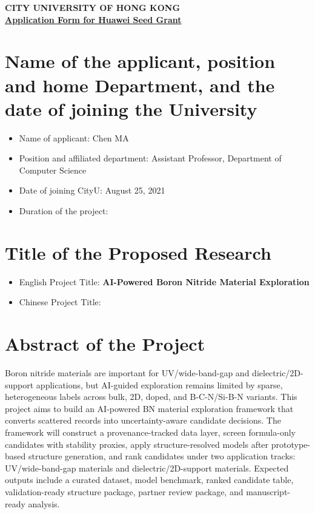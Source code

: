 \documentclass[10pt,a4paper]{article}
\newcommand{\blank}[1][7em]{\colorbox{yellow!35}{\rule{0pt}{1.05em}\hspace{#1}}}
\begin{document}
\vspace*{-34pt}
\begin{center}
    \textbf{CITY UNIVERSITY OF HONG KONG}\\
    \vspace{6pt}
    \underline{\textbf{Application Form for Huawei Seed Grant}}
\end{center}

\section{Name of the applicant, position and home Department, and the date of joining the University}
\begin{itemize}[leftmargin=15pt]
    \item Name of applicant: Chen MA
    \item Position and affiliated department: Assistant Professor, Department of Computer Science
    \item Date of joining CityU: August 25, 2021
    \item Duration of the project: \blank[18em]
\end{itemize}

\section{Title of the Proposed Research}
\begin{itemize}[leftmargin=15pt]
    \item English Project Title: \textbf{AI-Powered Boron Nitride Material Exploration}
    \item Chinese Project Title: \blank[18em]
\end{itemize}

\section{Abstract of the Project}
Boron nitride materials are important for UV/wide-band-gap and dielectric/2D-support applications, but AI-guided exploration remains limited by sparse, heterogeneous labels across bulk, 2D, doped, and B-C-N/Si-B-N variants. This project aims to build an AI-powered BN material exploration framework that converts scattered records into uncertainty-aware candidate decisions. The framework will construct a provenance-tracked data layer, screen formula-only candidates with stability proxies, apply structure-resolved models after prototype-based structure generation, and rank candidates under two application tracks: UV/wide-band-gap materials and dielectric/2D-support materials. Expected outputs include a curated dataset, model benchmark, ranked candidate table, validation-ready structure package, partner review package, and manuscript-ready analysis.
\end{document}
